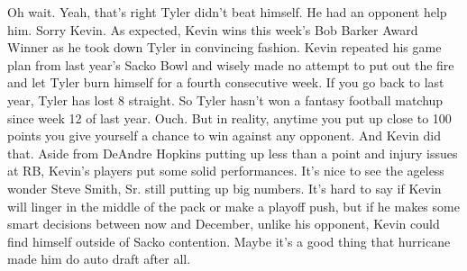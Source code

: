 \documentclass[11pt,letterpaper]{article}
\begin{document}
\par\noindent Oh wait. Yeah, that's right Tyler didn't beat himself. He had an opponent help him. Sorry Kevin. As expected, Kevin wins this week's Bob Barker Award Winner as he took down Tyler in convincing fashion. Kevin repeated his game plan from last year's Sacko Bowl and wisely made no attempt to put out the fire and let Tyler burn himself for a fourth consecutive week. If you go back to last year, Tyler has lost 8 straight. So Tyler hasn't won a fantasy football matchup since week 12 of last year. Ouch. But in reality, anytime you put up close to 100 points you give yourself a chance to win against any opponent. And Kevin did that. Aside from DeAndre Hopkins putting up less than a point and injury issues at RB, Kevin's players put some solid performances. It's nice to see the ageless wonder Steve Smith, Sr. still putting up big numbers. It's hard to say if Kevin will linger in the middle of the pack or make a playoff push, but if he makes some smart decisions between now and December, unlike his opponent, Kevin could find himself outside of Sacko contention. Maybe it's a good thing that hurricane made him do auto draft after all. 
\end{document}

